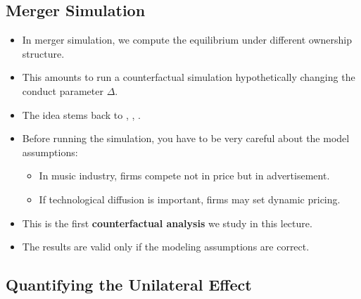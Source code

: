 \documentclass[]{book}
\providecommand{\tightlist}{%
  \setlength{\itemsep}{0pt}\setlength{\parskip}{0pt}}
\begin{document}
\subsection{Merger Simulation}\label{merger-simulation-1}

\begin{itemize}
\tightlist
\item
  In merger simulation, we compute the equilibrium under different
  ownership structure.
\item
  This amounts to run a counterfactual simulation hypothetically
  changing the conduct parameter \(\Delta\).
\item
  The idea stems back to \citet{Farrell1990}, \citet{Werden1994},
  \citet{Hausman1994}.
\item
  Before running the simulation, you have to be very careful about the
  model assumptions:

  \begin{itemize}
  \tightlist
  \item
    In music industry, firms compete not in price but in advertisement.
  \item
    If technological diffusion is important, firms may set dynamic
    pricing.
  \end{itemize}
\item
  This is the first \textbf{counterfactual analysis} we study in this
  lecture.
\item
  The results are valid only if the modeling assumptions are correct.
\end{itemize}

\subsection{Quantifying the Unilateral
Effect}\label{quantifying-the-unilateral-effect}
\end{document}
